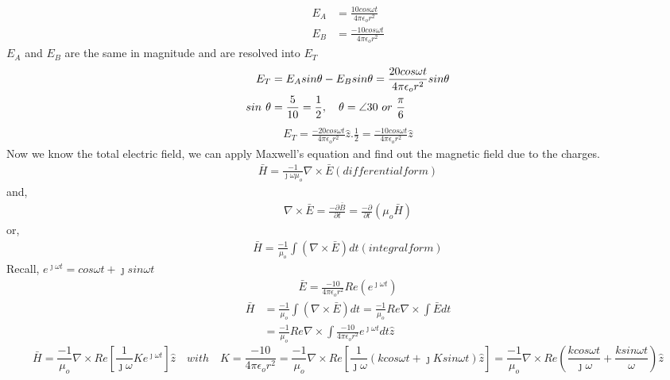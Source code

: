 \begin{exmp}
\begin{align*}
E_A &= \frac{10cos\omega t}{4\pi\epsilon_or^2}\\
E_B &= \frac{-10cos\omega t}{4\pi\epsilon_o r^2}
\end{align*}
$E_A$ and $E_B$ are the same in magnitude and are resolved into $E_T$
\begin{align*}
E_T &= E_Asin\theta - E_Bsin\theta = \frac{20cos\omega t}{4\pi\epsilon_o r^2}sin\theta \\
sin \hspace{0.05in} \theta &= \frac{5}{10} = \frac{1}{2}, \quad \theta = \angle {30} \ or \ \frac{\pi}{6}
\end{align*}
\begin{align*}
E_T = \frac{-20cos\omega t}{4\pi\epsilon_o r^2}\hat{z}.\frac{1}{2} = \frac{-10cos\omega t}{4\pi\epsilon_o r^2}\hat{z}
\end{align*}
Now we know the total electric field, we can apply Maxwell's equation and find out the magnetic field due to the charges.
\begin{align*}
\bar{H} = \frac{-1}{\jmath\omega\mu_o}\nabla\times\bar{E}(differential form)
\end{align*}
and,
\begin{align*}
\nabla\times\bar{E} = \frac{-\partial\bar{B}}{\partial t} = \frac{-\partial}{\partial t}(\mu_o\bar{H})
\end{align*}
or,
\begin{align*}
\bar{H} = \frac{-1}{\mu_o}\int(\nabla\times\bar{E})dt(integral form)
\end{align*}
Recall, $ e^{\jmath\omega t} = cos\omega t + \jmath sin\omega t $
\begin{align*}
\bar{E} = \frac{-10}{4\pi\epsilon_o r^2}Re(e^{\jmath\omega t})
\end{align*}
\begin{align*}
\bar{H} &= \frac{-1}{\mu_o}\int(\nabla\times\bar{E})dt = \frac{-1}{\mu_o}Re\nabla\times\int\bar{E}dt\\
&= \frac{-1}{\mu_o}Re\nabla\times\int\frac{-10}{4\pi\epsilon_o r^2}e^{\jmath\omega t}dt\hat{z}
\end{align*}
\begin{dmath*}
\bar{H} = \frac{-1}{\mu_o}\nabla\times Re\left[\frac{1}{\jmath\omega}Ke^{\jmath\omega t} \right]\hat{z}\quad with\quad K =\frac{-10}{4\pi\epsilon_o r^2}
=\frac{-1}{\mu_o}\nabla\times Re\left[\frac{1}{\jmath\omega}(kcos\omega t + \jmath Ksin\omega t)\hat{z} \right]
= \frac{-1}{\mu_o}\nabla\times Re\left(\frac{kcos\omega t}{\jmath\omega} + \frac{ksin\omega t}{\omega} \right)\hat{z}

\end{dmath*}
\end{exmp}

